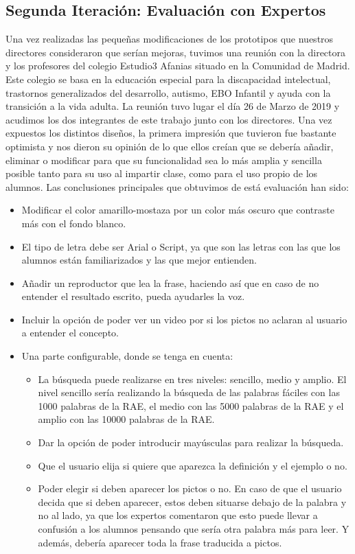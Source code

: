 	
	 
\subsection{Segunda Iteración: Evaluación con Expertos}
\label{cap:subsec:evaluacionExpertos}

Una vez realizadas las pequeñas modificaciones de los prototipos que nuestros directores consideraron que serían mejoras, tuvimos una reunión con la directora y los profesores del colegio Estudio3 Afanias situado en la Comunidad de Madrid. Este colegio se basa en la educación especial para la discapacidad intelectual, trastornos generalizados del desarrollo, autismo, EBO Infantil y ayuda con la transición a la vida adulta.
La reunión tuvo lugar el día 26 de Marzo de 2019 y acudimos los dos integrantes de este trabajo junto con los directores.
Una vez expuestos los distintos diseños, la primera impresión que tuvieron fue bastante optimista y nos dieron su opinión de lo que ellos creían que se debería añadir, eliminar o modificar para que su funcionalidad sea lo más amplia y sencilla posible tanto para su uso al impartir clase, como para el uso propio de los alumnos. 
Las conclusiones principales que obtuvimos de está evaluación han sido:
\begin{itemize} 
	\item Modificar el color amarillo-mostaza por un color más oscuro que contraste más con el fondo blanco.
	\item El tipo de letra debe ser Arial o Script, ya que son las letras con las que los alumnos están familiarizados y las que mejor entienden.
	\item Añadir un reproductor que lea la frase, haciendo así que en caso de no entender el resultado escrito, pueda ayudarles la voz.
	\item Incluir la opción de poder ver un video por si los pictos no aclaran al usuario a entender el concepto.
	\item Una parte configurable, donde se tenga en cuenta:
	\begin{itemize}
		\item La búsqueda puede realizarse en tres niveles: sencillo, medio y amplio. El nivel sencillo sería realizando la búsqueda de las palabras fáciles con las 1000 palabras de la RAE, el medio con las 5000 palabras de la RAE y el amplio con las 10000 palabras de la RAE. 
		\item Dar la opción de poder introducir mayúsculas para realizar la búsqueda.
		\item Que el usuario elija si quiere que aparezca la definición y el ejemplo o no.
		\item Poder elegir si deben aparecer los pictos o no. En caso de que el usuario decida que si deben aparecer, estos deben situarse debajo de la palabra y no al lado, ya que los expertos comentaron que esto puede llevar a confusión a los alumnos pensando que sería otra palabra más para leer. Y además, debería aparecer toda la frase traducida a pictos.
	\end{itemize}
\end{itemize}
